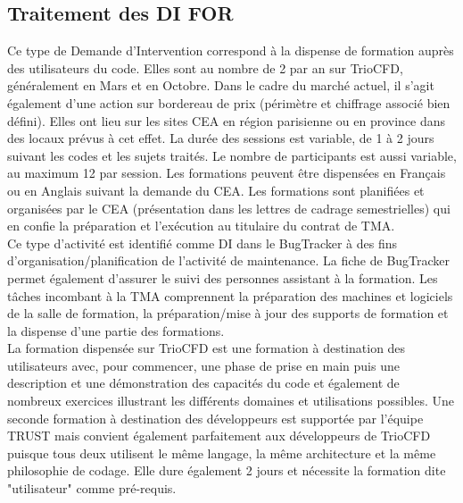 \subsection{Traitement des DI FOR}
Ce type de Demande d'Intervention correspond à la dispense de formation auprès des utilisateurs du code. Elles sont au nombre de 2 par an sur TrioCFD, généralement en Mars et en Octobre. Dans le cadre du marché actuel, il s'agit également d'une action sur bordereau de prix (périmètre et chiffrage associé bien défini). Elles ont lieu sur les sites CEA en région parisienne ou en province dans des locaux prévus à cet effet. La durée des sessions est variable, de 1 à 2 jours suivant les codes et les sujets traités. Le nombre de participants est aussi variable, au maximum 12 par session. Les formations peuvent être dispensées en Français ou en Anglais suivant la demande du CEA. Les formations sont planifiées et organisées par le CEA (présentation dans les lettres de cadrage semestrielles) qui en confie la préparation et l'exécution au titulaire du contrat de TMA. \\

Ce type d'activité est identifié comme DI dans le BugTracker à des fins d'organisation/planification de l'activité de maintenance. La fiche de BugTracker permet également d'assurer le suivi des personnes assistant à la formation. Les tâches incombant à la TMA comprennent la préparation des machines et logiciels de la salle de formation, la préparation/mise à jour des supports de formation et la dispense d'une partie des formations.\\

La formation dispensée sur TrioCFD est une formation à destination des utilisateurs avec, pour commencer, une phase de prise en main puis une description et une démonstration des capacités du code et également de nombreux exercices illustrant les différents domaines et utilisations possibles. Une seconde formation à destination des développeurs est supportée par l'équipe TRUST mais convient également parfaitement aux développeurs de TrioCFD puisque tous deux utilisent le même langage, la même architecture et la même philosophie de codage. Elle dure également 2 jours et nécessite la formation dite "utilisateur" comme pré-requis.\\

